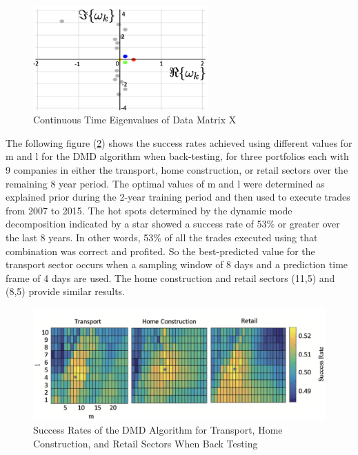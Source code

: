 \documentclass[12pt]{report}
\begin{document}
\begin{figure}[H]
    \centering
    \includegraphics[width=0.6\textwidth]{Application pics/MA680 (F) EV.png}
    \caption{Continuous Time Eigenvalues of Data Matrix X} \label{fig:FEV}
\end{figure}
\noindent

The following figure (\ref{fig:FSR}) shows the success rates achieved using different values for m and l for the DMD algorithm when back-testing, for three portfolios each with 9 companies in either the transport, home construction, or retail sectors over the remaining 8 year period. The optimal values of m and l were determined as explained prior during the 2-year training period and then used to execute trades from 2007 to 2015. The hot spots determined by the dynamic mode decomposition indicated by a star showed a success rate of 53$\%$ or greater over the last 8 years. In other words, 53$\%$ of all the trades executed using that combination was correct and profited. So the best-predicted value for the transport sector occurs when a sampling window of 8 days and a prediction time frame of 4 days are used. The home construction and retail sectors (11,5) and (8,5) provide similar results. 

\begin{figure}[H]
    \centering
    \includegraphics[width=1.1\textwidth]{Application pics/MA680 (F) SR.png}
    \caption{Success Rates of the DMD Algorithm for Transport, Home Construction, and Retail Sectors When Back Testing} \label{fig:FSR}
\end{figure}
\noindent
\end{document}
